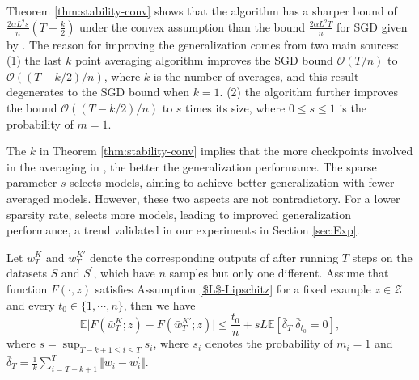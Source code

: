 \begin{remark}
Theorem \ref{thm:stability-conv} shows that the \method{} algorithm has a sharper bound of $\frac{2\alpha L^2 s}{n} \left(T - \frac{k}{2} \right)$ under the convex assumption than the bound $\frac{2\alpha L^2 T}{n}$ for SGD given by \citet{hardt2016train}. The reason for improving the generalization comes from two main sources: (1) the last $k$ point averaging algorithm improves the SGD bound $\mathcal{O}(T/n)$ to $\mathcal{O}((T-k/2)/n)$, where $k$ is the number of averages, and this result degenerates to the SGD bound when $k = 1$. (2) the \method{} algorithm further improves the bound $\mathcal{O}((T-k/2)/n)$ to $s$ times its size, where $0\leq s \leq 1$ is the probability of $m = 1$.   
\end{remark}

\begin{remark}
The $k$ in Theorem \ref{thm:stability-conv} implies that the more checkpoints involved in the averaging in \method{}, the better the generalization performance. The sparse parameter $s$ selects models, aiming to achieve better generalization with fewer averaged models. However, these two aspects are not contradictory. For a lower sparsity rate, \method{} selects more models, leading to improved generalization performance, a trend validated in our experiments in Section \ref{sec:Exp}.
\end{remark}

\begin{lemma}\label{nonconvex-basic}
Let $\bar{w}_{T}^K$ and $\bar{w}_{T}^{K\prime}$ denote the corresponding outputs of \method{} after running $T$ steps on the datasets $S$ and $S^{\prime}$, which have $n$ samples but only one different. Assume that function $F(\cdot,z)$ satisfies Assumption \ref{$L$-Lipschitz} for a fixed example $z\in\mathcal{Z}$ and every $t_0 \in \{1,\cdots,n\}$, then we have
\begin{equation}\label{eq_nonconvex-basic}
\mathbb{E}\vert F(\bar{w}_{T}^K;z)-F(\bar{w}_{T}^{K\prime};z)\vert \leq \frac{t_0}{n} + sL \mathbb{E}\left[\bar{\delta}_{T}\vert \bar{\delta}_{t_0}=0\right],
\end{equation}   
where $s=\sup_{T-k+1\leq i\leq T} s_i$, where $s_i$ denotes the probability of $m_i=1$ and $\bar{\delta}_T=\frac{1}{k}\sum_{i=T-k+1}^{T}\Vert w_i-w_i^{\prime}\Vert$.
\end{lemma}

